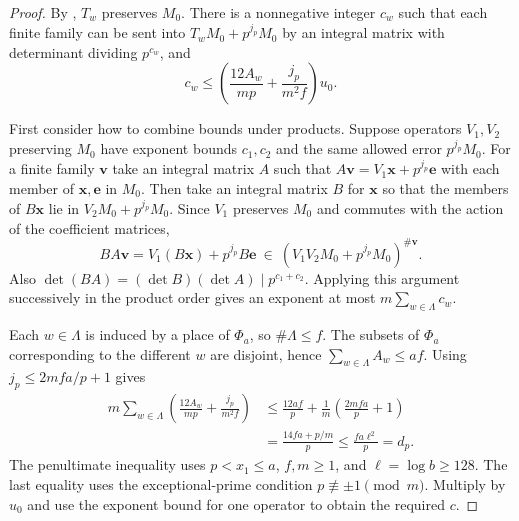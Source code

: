\begin{proof}
By , $T_w$ preserves $M_0$. There is a nonnegative integer $c_w$ such that each finite family can be sent into $T_w M_0+p^{j_p}M_0$ by an integral matrix with determinant dividing $p^{c_w}$, and
\[
 c_w\le
  \left(\frac{12A_w}{mp}+\frac{j_p}{m^2f}\right)u_0 .
\]

First consider how to combine bounds under products. Suppose operators $V_1,V_2$ preserving $M_0$ have exponent bounds $c_1,c_2$ and the same allowed error $p^{j_p}M_0$. For a finite family $\boldsymbol v$ take an integral matrix $A$ such that
$A\boldsymbol v=V_1\boldsymbol x+p^{j_p}\boldsymbol e$ with each member of $\boldsymbol x,\boldsymbol e$ in $M_0$. Then take an integral matrix $B$ for $\boldsymbol x$ so that the members of $B\boldsymbol x$ lie in $V_2M_0+p^{j_p}M_0$. Since $V_1$ preserves $M_0$ and commutes with the action of the coefficient matrices,
\[
 BA\boldsymbol v=V_1(B\boldsymbol x)+p^{j_p}B\boldsymbol e
    \ \in\ (V_1V_2M_0+p^{j_p}M_0)^{\#\boldsymbol v}.
\]
Also $\det(BA)=(\det B)(\det A)\mid p^{c_1+c_2}$. Applying this argument successively in the product order gives an exponent at most $m\sum_{w\in\Lambda}c_w$.

Each $w\in\Lambda$ is induced by a place of $\Phi_a$, so $\#\Lambda\le f$. The subsets of $\Phi_a$ corresponding to the different $w$ are disjoint, hence $\sum_{w\in\Lambda} A_w\le af$. Using $j_p\le 2mfa/p+1$ gives
\[
 \begin{aligned}
 m\sum_{w\in\Lambda}
       \left(\frac{12A_w}{mp}+\frac{j_p}{m^2f}\right)
 &\le \frac{12af}{p}+\frac{1}{m}\left(\frac{2mfa}{p}+1\right)\\
 &=\frac{14fa+p/m}{p}
 \le \frac{fa\ell^2}{p}
 =d_p .
 \end{aligned}
\]
The penultimate inequality uses $p<x_1\le a$, $f,m\ge1$, and $\ell=\log b\ge128$. The last equality uses the exceptional-prime condition $p\not\equiv\pm1\pmod m$. Multiply by $u_0$ and use the exponent bound for one operator to obtain the required $c$.
\end{proof}

